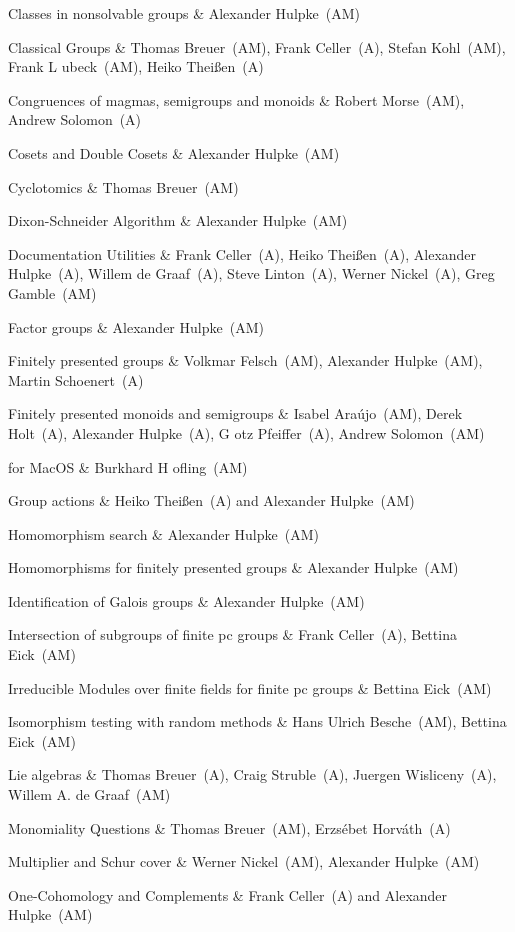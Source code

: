 Classes in nonsolvable groups &
Alexander Hulpke~(AM)

Classical Groups &
Thomas Breuer~(AM), Frank Celler~(A), Stefan Kohl~(AM), 
Frank L{ u}beck~(AM), Heiko Thei{\ss}en~(A)

Congruences of magmas, semigroups and monoids &
Robert Morse~(AM), Andrew Solomon~(A)

Cosets and Double Cosets &
Alexander Hulpke~(AM)

Cyclotomics &
Thomas Breuer~(AM)

Dixon-Schneider Algorithm &
Alexander Hulpke~(AM)

Documentation Utilities &
Frank Celler~(A), Heiko Thei{\ss}en~(A), Alexander Hulpke~(A), 
Willem de Graaf~(A), Steve Linton~(A), Werner Nickel~(A), Greg Gamble~(AM)

Factor groups &
Alexander Hulpke~(AM)

Finitely presented groups &
Volkmar Felsch~(AM), Alexander Hulpke~(AM), Martin Schoenert~(A)

Finitely presented monoids and semigroups &
Isabel Ara{\'u}jo~(AM), Derek Holt~(A), Alexander Hulpke~(A), G{ o}tz Pfeiffer~(A), Andrew Solomon~(AM)

{\GAP} for MacOS & 
Burkhard H{ o}fling~(AM)

Group actions &
Heiko Thei{\ss}en~(A) and Alexander Hulpke~(AM)

Homomorphism search &
Alexander Hulpke~(AM)

Homomorphisms for finitely presented groups &
Alexander Hulpke~(AM)

Identification of Galois groups &
Alexander Hulpke~(AM)

Intersection of subgroups of finite pc groups &
Frank Celler~(A), Bettina Eick~(AM)

Irreducible Modules over finite fields for finite pc groups &
Bettina Eick~(AM)

Isomorphism testing with random methods &
Hans Ulrich Besche~(AM), Bettina Eick~(AM)

Lie algebras &
Thomas Breuer~(A), Craig Struble~(A), Juergen Wisliceny~(A), Willem A. de Graaf~(AM)

Monomiality Questions &
Thomas Breuer~(AM), Erzs{\'e}bet Horv{\'a}th~(A)

Multiplier and Schur cover &
Werner Nickel~(AM), Alexander Hulpke~(AM)

One-Cohomology and Complements &
Frank Celler~(A) and Alexander Hulpke~(AM)

